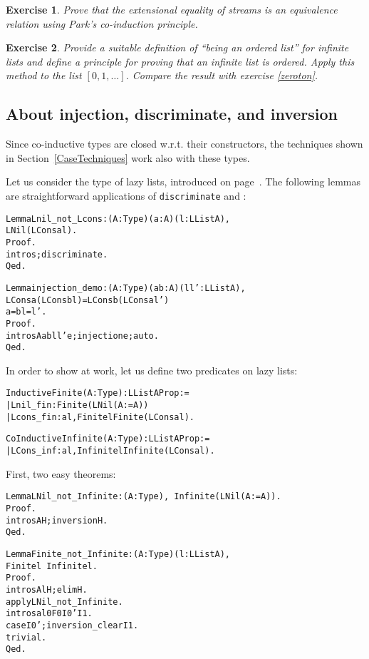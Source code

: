 \documentclass[11pt]{article}
\newtheorem{exercise}{Exercise}[section]
\begin{document}
\begin{exercise}
Prove that the extensional equality of streams is an equivalence relation
using Park's co-induction principle.
\end{exercise}


\begin{exercise}
Provide a suitable definition of ``being an ordered list'' for infinite lists
and define a principle for proving that an infinite list is ordered. Apply
this method to the list $[0,1,\ldots ]$. Compare the result with
exercise \ref{zeroton}.
\end{exercise}

\subsection{About injection, discriminate, and inversion}
Since co-inductive types are closed w.r.t. their constructors,
the techniques shown in Section~\ref{CaseTechniques} work also
with these types.

Let us consider the type of lazy lists, introduced on page~\pageref{CoInduction}.
The following lemmas are straightforward applications
 of \texttt{discriminate} and :

\begin{alltt}
Lemma Lnil_not_Lcons : {\prodsym} (A:Type)(a:A)(l:LList A),
                               LNil {\coqdiff} (LCons a l).
Proof.
 intros;discriminate.
Qed.

Lemma injection_demo : {\prodsym} (A:Type)(a b : A)(l l': LList A),
                  LCons a (LCons b l) = LCons b (LCons a l') {\arrow}
                  a = b {\coqand} l = l'.
Proof.
 intros A a b l l' e; injection e; auto.
Qed.

\end{alltt}

In order to show  at work, let us define
two predicates on lazy lists:

\begin{alltt}
Inductive Finite (A:Type) : LList A {\arrow} Prop :=
|  Lnil_fin : Finite (LNil (A:=A))
|  Lcons_fin : {\prodsym} a l, Finite l {\arrow} Finite (LCons a l).

CoInductive Infinite  (A:Type) : LList A {\arrow} Prop :=
| LCons_inf : {\prodsym} a l, Infinite l {\arrow} Infinite (LCons a l).
\end{alltt}

\noindent
First, two easy theorems:
\begin{alltt}
Lemma LNil_not_Infinite : {\prodsym} (A:Type), ~ Infinite (LNil (A:=A)).
Proof.
  intros A H;inversion H.
Qed.

Lemma Finite_not_Infinite : {\prodsym} (A:Type)(l:LList A),
                                Finite l {\arrow} ~ Infinite l.
Proof.
 intros A l H; elim H.
 apply LNil_not_Infinite.
 intros a l0 F0 I0' I1.
 case I0'; inversion_clear I1.
 trivial.
Qed.
\end{alltt}
\end{document}
